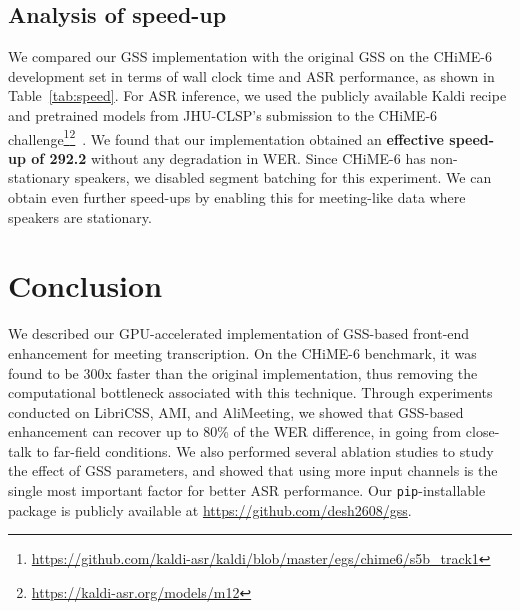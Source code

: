 \documentclass[a4paper]{article}
\begin{document}
\begin{table}[t]
\centering
\caption{Compute time for our GSS implementation compared with original on CHiME-6 dev set, using all available channels, 15s context, and 20 BSS iterations. ``Time'' is the actual wall clock time (in hours), while ``cum. time'' is the effective total time for all jobs. Speedup is the ratio of the cumulative times.}
\label{tab:speed}
\end{table}


\subsection{Analysis of speed-up}
\label{sec:speed}


We compared our GSS implementation with the original GSS on the CHiME-6 development set in terms of wall clock time and ASR performance, as shown in Table~\ref{tab:speed}. For ASR inference, we used the publicly available Kaldi recipe and pretrained models from JHU-CLSP's submission to the CHiME-6 challenge\footnote{\url{https://github.com/kaldi-asr/kaldi/blob/master/egs/chime6/s5b_track1}}\footnote{\url{https://kaldi-asr.org/models/m12}}~\cite{Arora2020TheJM}. We found that our implementation obtained an \textbf{effective speed-up of 292.2} without any degradation in WER. Since CHiME-6 has non-stationary speakers, we disabled segment batching for this experiment. We can obtain even further speed-ups by enabling this for meeting-like data where speakers are stationary.

\section{Conclusion}

We described our GPU-accelerated implementation of GSS-based front-end enhancement for meeting transcription. On the CHiME-6 benchmark, it was found to be 300x faster than the original implementation, thus removing the computational bottleneck associated with this technique. Through experiments conducted on LibriCSS, AMI, and AliMeeting, we showed that GSS-based enhancement can recover up to 80\% of the WER difference, in going from close-talk to far-field conditions. We also performed several ablation studies to study the effect of GSS parameters, and showed that using more input channels is the single most important factor for better ASR performance. Our \texttt{pip}-installable package is publicly available at \url{https://github.com/desh2608/gss}.
\end{document}
